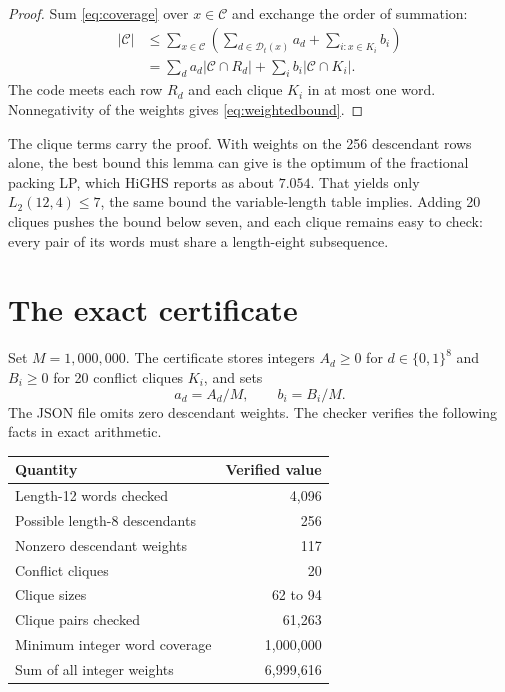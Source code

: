\documentclass[11pt]{article}
\theoremstyle{definition}
\newcommand{\bits}{\{0,1\}}
\newcommand{\D}{\mathcal{D}}
\newcommand{\C}{\mathcal{C}}
\begin{document}
\begin{proof}
Sum \eqref{eq:coverage} over $x\in\C$ and exchange the order of summation:
\begin{align*}
|\C|
&\leq \sum_{x\in\C}\left(
       \sum_{d\in\D_t(x)}a_d+\sum_{i:x\in K_i}b_i\right)\\
&=\sum_d a_d|\C\cap R_d|+\sum_i b_i|\C\cap K_i|.
\end{align*}
The code meets each row $R_d$ and each clique $K_i$ in at most one word.
Nonnegativity of the weights gives \eqref{eq:weightedbound}.
\end{proof}

The clique terms carry the proof.  With weights on the 256 descendant rows
alone, the best bound this lemma can give is the optimum of the fractional
packing LP, which HiGHS reports as about $7.054$.  That yields only
$L_2(12,4)\leq7$, the same bound the variable-length table implies.  Adding 20 cliques pushes the bound below seven,
and each clique remains easy to check: every pair of its words must share a
length-eight subsequence.

\section{The exact certificate}\label{sec:certificate}

Set $M=1{,}000{,}000$.  The certificate stores integers $A_d\geq0$ for
$d\in\bits^8$ and $B_i\geq0$ for 20 conflict cliques $K_i$, and sets
\[
  a_d=A_d/M,\qquad b_i=B_i/M.
\]
The JSON file omits zero descendant weights.  The checker verifies the
following facts in exact arithmetic.

\begin{center}
\begin{tabular}{@{}lr@{}}
\toprule
Quantity & Verified value\\
\midrule
Length-12 words checked & 4,096\\
Possible length-8 descendants & 256\\
Nonzero descendant weights & 117\\
Conflict cliques & 20\\
Clique sizes & 62 to 94\\
Clique pairs checked & 61,263\\
Minimum integer word coverage & 1,000,000\\
Sum of all integer weights & 6,999,616\\
\bottomrule
\end{tabular}
\end{center}
\end{document}
